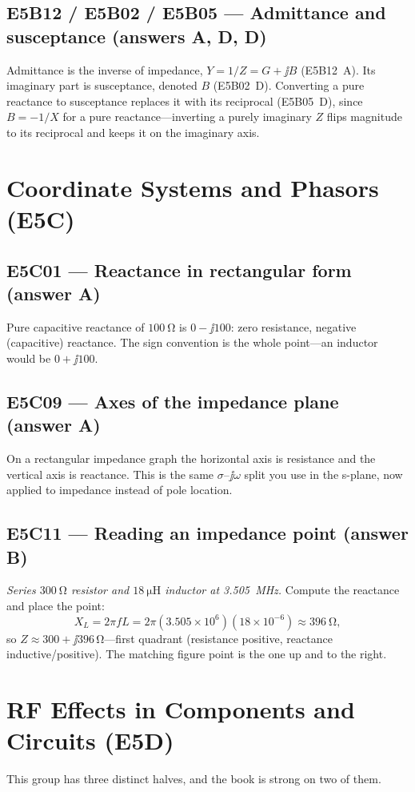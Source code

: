 \subsection*{E5B12 / E5B02 / E5B05 --- Admittance and susceptance (answers A, D, D)}
Admittance is the inverse of impedance, \(Y=1/Z=G+\jj B\) (E5B12~A). Its imaginary
part is susceptance, denoted \(B\) (E5B02~D). Converting a pure reactance to
susceptance replaces it with its reciprocal (E5B05~D), since \(B=-1/X\) for a pure
reactance---inverting a purely imaginary \(Z\) flips magnitude to its reciprocal
and keeps it on the imaginary axis.

\section{Coordinate Systems and Phasors (E5C)}

\subsection*{E5C01 --- Reactance in rectangular form (answer A)}
Pure capacitive reactance of \(\SI{100}{\ohm}\) is \(0-\jj100\): zero resistance,
negative (capacitive) reactance. The sign convention is the whole point---an
inductor would be \(0+\jj100\).

\subsection*{E5C09 --- Axes of the impedance plane (answer A)}
On a rectangular impedance graph the horizontal axis is resistance and the
vertical axis is reactance. This is the same \(\sigma\)--\(\jj\omega\) split you
use in the s-plane, now applied to impedance instead of pole location.

\subsection*{E5C11 --- Reading an impedance point (answer B)}
\emph{Series \(\SI{300}{\ohm}\) resistor and \(\SI{18}{\micro\henry}\) inductor at
\SI{3.505}{\mega\hertz}.} Compute the reactance and place the point:
\[
X_L=2\pi f L=2\pi(3.505\times10^6)(18\times10^{-6})\approx\SI{396}{\ohm},
\]
so \(Z\approx300+\jj396\,\si{\ohm}\)---first quadrant (resistance positive, reactance
inductive/positive). The matching figure point is the one up and to the right.

\section{RF Effects in Components and Circuits (E5D)}
This group has three distinct halves, and the book is strong on two of them.

